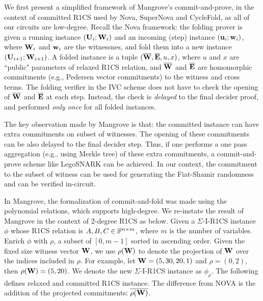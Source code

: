 We first present a simplified framework of Mangrove's 
commit-and-prove, in the context of committed R1CS used by Nova,
SuperNova and CycleFold, as all of our circuits are low-degree.
Recall the Nova \cite{Nova} framework: the folding prover
is given a running instance $({{\mathbf {U}}}_i; {{\mathbf {W}}}_i)$ and an incoming (step)
instance $({{\mathbf {u}}}_i; {{\mathbf {w}}}_i)$, where ${{\mathbf {W}}}_i$ and 
${{\mathbf {w}}}_i$ are the witnessnes,
and fold them into a new instance $({{\mathbf {U}}}_{i+1}; {{\mathbf {W}}}_{i+1})$. 
A folded instance is a tuple 
$(\overline{{{\mathbf {W}}}}, \overline{{{\mathbf {E}}}}, u, x)$,
where $u$ and $x$ are ``public" parameters of relaxed R1CS relation,
and $\overline{{{\mathbf {W}}}}$ and $\overline{{{\mathbf {E}}}}$ are homomorphic
commitments (e.g., Pedersen vector commitments) to the
witness and cross terms. The folding verifier in the IVC scheme
does not have to check the opening of $\overline{{{\mathbf {W}}}}$ and 
$\overline{{{\mathbf {E}}}}$ at each step. Instead, the 
check is {\em delayed} to the final decider proof,
and performed {\em only once} for all folded instances. 

The key observation made by Mangrove \cite{Mangrove} is that:
the committed instance can have extra commitments on subset of witnesses.
The opening of these commitments can be also delayed to the 
final decider step. Thus, if one performs a one pass aggregation (e.g.,
using Merkle tree) of these extra commitments, a commit-and-prove
scheme like LegoSNARK \cite{LegoSnark} can be achieved.  
In our context, the commitment to the subset of witness
can be used for generating the Fiat-Shamir randomness
and can be verified in-circuit.

In Mangrove, the formalization of commit-and-fold
was made using the polynomial relations, which supports high-degree.
We re-instate the result of Mangrove in the context of 2-degree R1CS
as below.
Given a $\Sigma$-I-R1CS instance $\phi$ whose
R1CS relation is $A,B,C \in \mathbb{F}^{n\times m}$, where
$m$ is the number of variables. Enrich $\phi$ with
$\rho$, a subset of $[0,m-1]$ sorted in ascending order.
Given the fixed size witness vector ${{\mathbf {W}}}$, we
use $\rho({{\mathbf {W}}})$ to denote the projection of ${{\mathbf {W}}}$ over
the indices included in $\rho$. For example, let
${{\mathbf {W}}} = (5, 30, 20, 1)$ and $\rho = (0, 2)$, then
$\rho({{\mathbf {W}}}) = (5, 20)$.
We denote the new $\Sigma$-I-R1CS instance as 
$\phi_{\rho}$.
The following defines relaxed and committed R1CS instance.
The difference from NOVA is the addition of the
projected commitments: $\overline{\rho({{\mathbf {W}}})}$.

